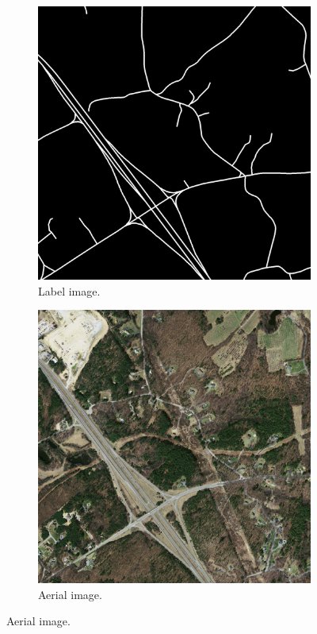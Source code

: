 \begin{figure}
\begin{subfigure}{0.48\textwidth}
\includegraphics[width=\textwidth]{figs/E6/E6-label.jpg}
\caption{Label image.} \label{fig:E6_label_iamge}
\vspace{0.5cm} %
\end{subfigure}
\hspace*{\fill} %
\begin{subfigure}{0.48\textwidth}
\includegraphics[width=\textwidth]{figs/E6/E6-image.jpg}
\caption{Aerial image.} \label{fig:E6_aerial_image}
\vspace{0.5cm} %
\end{subfigure}


\end{figure}
